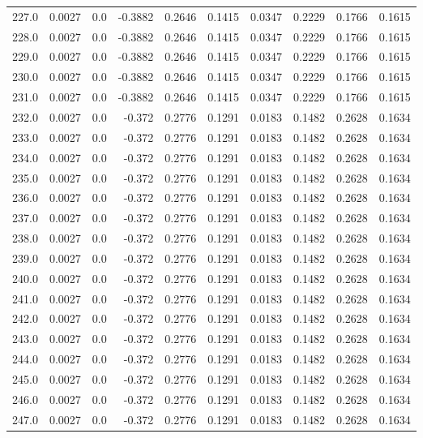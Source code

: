 \begin{longtable}{lrrrrrrrrr}
227.0 & 0.0027 & 0.0 & -0.3882 & 0.2646 & 0.1415 & 0.0347 & 0.2229 & 0.1766 & 0.1615 \\
228.0 & 0.0027 & 0.0 & -0.3882 & 0.2646 & 0.1415 & 0.0347 & 0.2229 & 0.1766 & 0.1615 \\
229.0 & 0.0027 & 0.0 & -0.3882 & 0.2646 & 0.1415 & 0.0347 & 0.2229 & 0.1766 & 0.1615 \\
230.0 & 0.0027 & 0.0 & -0.3882 & 0.2646 & 0.1415 & 0.0347 & 0.2229 & 0.1766 & 0.1615 \\
231.0 & 0.0027 & 0.0 & -0.3882 & 0.2646 & 0.1415 & 0.0347 & 0.2229 & 0.1766 & 0.1615 \\
232.0 & 0.0027 & 0.0 & -0.372 & 0.2776 & 0.1291 & 0.0183 & 0.1482 & 0.2628 & 0.1634 \\
233.0 & 0.0027 & 0.0 & -0.372 & 0.2776 & 0.1291 & 0.0183 & 0.1482 & 0.2628 & 0.1634 \\
234.0 & 0.0027 & 0.0 & -0.372 & 0.2776 & 0.1291 & 0.0183 & 0.1482 & 0.2628 & 0.1634 \\
235.0 & 0.0027 & 0.0 & -0.372 & 0.2776 & 0.1291 & 0.0183 & 0.1482 & 0.2628 & 0.1634 \\
236.0 & 0.0027 & 0.0 & -0.372 & 0.2776 & 0.1291 & 0.0183 & 0.1482 & 0.2628 & 0.1634 \\
237.0 & 0.0027 & 0.0 & -0.372 & 0.2776 & 0.1291 & 0.0183 & 0.1482 & 0.2628 & 0.1634 \\
238.0 & 0.0027 & 0.0 & -0.372 & 0.2776 & 0.1291 & 0.0183 & 0.1482 & 0.2628 & 0.1634 \\
239.0 & 0.0027 & 0.0 & -0.372 & 0.2776 & 0.1291 & 0.0183 & 0.1482 & 0.2628 & 0.1634 \\
240.0 & 0.0027 & 0.0 & -0.372 & 0.2776 & 0.1291 & 0.0183 & 0.1482 & 0.2628 & 0.1634 \\
241.0 & 0.0027 & 0.0 & -0.372 & 0.2776 & 0.1291 & 0.0183 & 0.1482 & 0.2628 & 0.1634 \\
242.0 & 0.0027 & 0.0 & -0.372 & 0.2776 & 0.1291 & 0.0183 & 0.1482 & 0.2628 & 0.1634 \\
243.0 & 0.0027 & 0.0 & -0.372 & 0.2776 & 0.1291 & 0.0183 & 0.1482 & 0.2628 & 0.1634 \\
244.0 & 0.0027 & 0.0 & -0.372 & 0.2776 & 0.1291 & 0.0183 & 0.1482 & 0.2628 & 0.1634 \\
245.0 & 0.0027 & 0.0 & -0.372 & 0.2776 & 0.1291 & 0.0183 & 0.1482 & 0.2628 & 0.1634 \\
246.0 & 0.0027 & 0.0 & -0.372 & 0.2776 & 0.1291 & 0.0183 & 0.1482 & 0.2628 & 0.1634 \\
247.0 & 0.0027 & 0.0 & -0.372 & 0.2776 & 0.1291 & 0.0183 & 0.1482 & 0.2628 & 0.1634 \\

\end{longtable}
